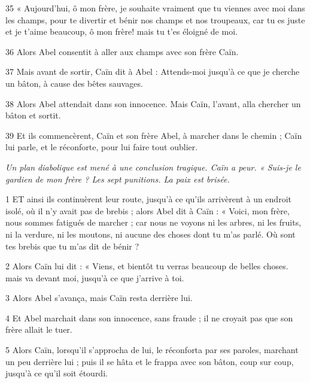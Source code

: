 \par 35 « Aujourd'hui, ô mon frère, je souhaite vraiment que tu viennes avec moi dans les champs, pour te divertir et bénir nos champs et nos troupeaux, car tu es juste et je t'aime beaucoup, ô mon frère! mais tu t'es éloigné de moi.

\par 36 Alors Abel consentit à aller aux champs avec son frère Caïn.

\par 37 Mais avant de sortir, Caïn dit à Abel : Attends-moi jusqu'à ce que je cherche un bâton, à cause des bêtes sauvages.

\par 38 Alors Abel attendait dans son innocence. Mais Caïn, l'avant, alla chercher un bâton et sortit.

\par 39 Et ils commencèrent, Caïn et son frère Abel, à marcher dans le chemin ; Caïn lui parle, et le réconforte, pour lui faire tout oublier.


\par \textit{Un plan diabolique est mené à une conclusion tragique. Caïn a peur. « Suis-je le gardien de mon frère ? Les sept punitions. La paix est brisée.}

\par 1 ET ainsi ils continuèrent leur route, jusqu'à ce qu'ils arrivèrent à un endroit isolé, où il n'y avait pas de brebis ; alors Abel dit à Caïn : « Voici, mon frère, nous sommes fatigués de marcher ; car nous ne voyons ni les arbres, ni les fruits, ni la verdure, ni les moutons, ni aucune des choses dont tu m'as parlé. Où sont tes brebis que tu m’as dit de bénir ?

\par 2 Alors Caïn lui dit : « Viens, et bientôt tu verras beaucoup de belles choses. mais va devant moi, jusqu'à ce que j'arrive à toi.

\par 3 Alors Abel s'avança, mais Caïn resta derrière lui.

\par 4 Et Abel marchait dans son innocence, sans fraude ; il ne croyait pas que son frère allait le tuer.

\par 5 Alors Caïn, lorsqu'il s'approcha de lui, le réconforta par ses paroles, marchant un peu derrière lui ; puis il se hâta et le frappa avec son bâton, coup sur coup, jusqu'à ce qu'il soit étourdi.

